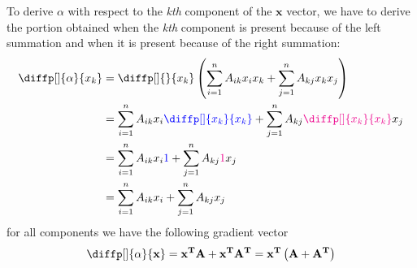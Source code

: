 \documentclass[12pt]{article}
\newcommand{\bvec}[1]{\boldsymbol{\mathbf{#1}}} %
\newcommand{\bvecT}[1]{\boldsymbol{\mathbf{#1^T}}} %
\newcommand{\mat}[1]{\boldsymbol{\mathbf{#1}}}
\newcommand{\matT}[1]{\boldsymbol{\mathbf{#1^T}}}
\newcommand{\parentheses}[1]{\left(#1\right)}
\newcommand{\Sum}[3][i]{\sum\limits_{#1 = #2}^{#3}}
\newcommand{\blue}[1]{\color{blue}#1\color{black}}
\newcommand{\magenta}[1]{\color{magenta}#1\color{black}}
\begin{document}
To derive $\alpha$ with respect to the \textit{kth} component of the $\bvec{x}$ vector, we have to derive the portion obtained when the \textit{kth} component is present because of the left summation and when it is present because of the right summation:
\begin{equation}
\begin{aligned}
    \diffp[]{\alpha}{x_k} &= \diffp[]{}{x_k} \parentheses{\Sum{1}{n} A_{ik}x_i x_k + \Sum[j]{1}{n} A_{kj}x_k x_j} \\
    &= \Sum{1}{n} A_{ik}x_i \blue{\diffp[]{x_k}{x_k}} + \Sum[j]{1}{n} A_{kj}\magenta{\diffp[]{x_k}{x_k}} x_j\\
    &= \Sum{1}{n} A_{ik}x_i \blue{1} + \Sum[j]{1}{n} A_{kj}\magenta{1} x_j\\
    &= \Sum{1}{n} A_{ik}x_i + \Sum[j]{1}{n} A_{kj} x_j\\
\end{aligned}
\label{}
\end{equation}
for all components we have the following gradient vector
\begin{equation}
    \diffp[]{\alpha}{\bvec{x}} = \bvecT{x}\mat{A} + \bvecT{x}\matT{A} = \bvecT{x} \parentheses{\mat{A} + \matT{A}}
\end{equation}
\end{document}
